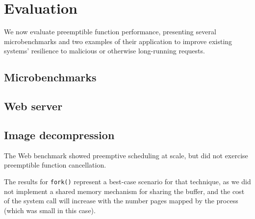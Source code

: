 \section{Evaluation}
\label{sec:eval}

We now evaluate preemptible function performance, presenting several
microbenchmarks and two examples of their application to improve
existing systems' resilience to malicious or otherwise long-running
requests.




\subsection{Microbenchmarks}





\subsection{Web server}




\subsection{Image decompression}

The Web benchmark showed preemptive scheduling at scale, but did not exercise
preemptible function cancellation.

The
results for \texttt{fork()} represent a best-case scenario for that technique, as we
did not implement a shared memory mechanism for sharing the buffer, and the cost of
the system call will increase with the number pages mapped by the process (which was
small in this case).


